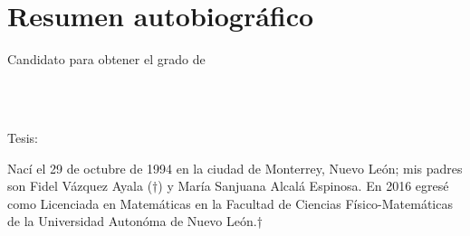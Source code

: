 
\chapter*{Resumen autobiográfico}
\thispagestyle{empty}

\begin{center}
\autor

Candidato para obtener el grado de\\
\grado\\
\orientacion\bigskip

\uanl\\
\fime\bigskip

Tesis:\\
\textsc{\large\titulo}
\end{center}\bigskip

Nací el 29 de octubre de 1994 en la ciudad de Monterrey, Nuevo León; mis padres son Fidel Vázquez Ayala ($\dagger$) y María Sanjuana Alcalá Espinosa. En 2016 egresé como Licenciada en Matemáticas en la Facultad de Ciencias Físico-Matemáticas de la Universidad Autonóma de Nuevo León.†
